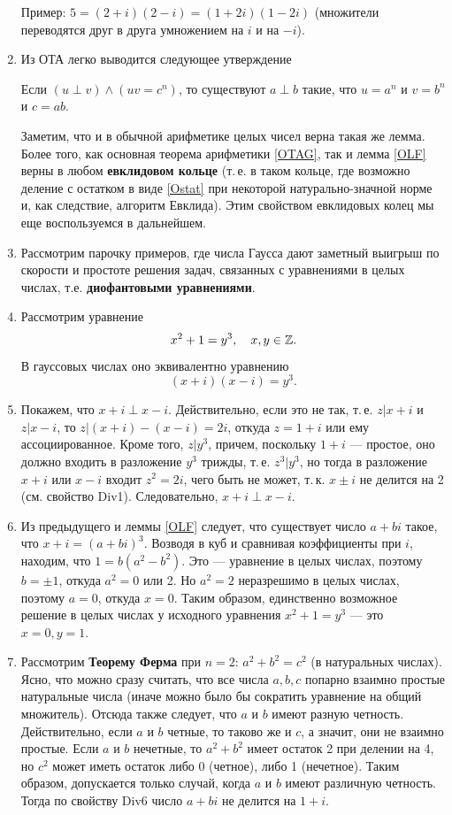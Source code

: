\begin{enumerate}
Пример: $5=(2+i)(2-i)=(1+2i)(1-2i)$ (множители переводятся друг в друга умножением на $i$ и на $-i$).

\item Из ОТА легко выводится следующее утверждение
\begin{lem}\label{OLF}
Если $(u\perp v)\land(uv=c^n)$, то существуют $a\perp b$ такие, что $u=a^n$ и $v=b^n$ и $c=ab$.
\end{lem}


Заметим, что и в обычной арифметике целых чисел верна такая же лемма. Более того, как основная теорема арифметики \ref{OTAG}, так и лемма \ref{OLF} верны в любом \textbf{евклидовом кольце} (т.\,е. в таком кольце, где возможно деление с остатком в виде \eqref{Ostat} при некоторой натурально-значной норме и, как следствие, алгоритм Евклида). Этим свойством евклидовых колец мы еще воспользуемся в дальнейшем.

\item Рассмотрим парочку примеров, где числа Гаусса дают заметный выигрыш по скорости и простоте решения задач, связанных с уравнениями в целых числах, т.е. \textbf{диофантовыми уравнениями}.
\item Рассмотрим уравнение $$x^2+1=y^3,\quad x,y\in\mathbb Z.$$
В гауссовых числах оно эквивалентно уравнению $$(x+i)(x-i)=y^3.$$

\item Покажем, что $x+i\perp x-i$. Действительно, если это не так, т.\,е. $z|x+i$ и $z|x-i$, то $z|(x+i)-(x-i)=2i$, откуда $z=1+i$ или ему ассоциированное. Кроме того, $z|y^3$, причем, поскольку $1+i$ --- простое, оно должно входить в разложение $y^3$ трижды, т.\,е. $z^3|y^3$, но тогда в разложение $x+i$ или $x-i$ входит $z^2=2i$, чего быть не может, т.\,к. $x\pm i$ не делится на 2 (см. свойство Div1). Следовательно, $x+i\perp x-i$.

\item Из предыдущего и леммы \ref{OLF} следует, что существует число $a+bi$ такое, что $x+i=(a+bi)^3$. Возводя в куб и сравнивая коэффициенты при $i$, находим, что $1=b(a^2-b^2)$. Это --- уравнение в целых числах, поэтому $b=\pm 1$, откуда $a^2=0$ или 2. Но $a^2=2$ неразрешимо в целых числах, поэтому $a=0$, откуда $x=0$. Таким образом, единственно возможное решение в целых числах у исходного уравнения $x^2+1=y^3$ --- это $x=0, y=1$.

\item Рассмотрим \textbf{Теорему Ферма} при $n=2$: $a^2+b^2=c^2$ (в натуральных числах). Ясно, что можно сразу считать, что все числа $a,b,c$ попарно взаимно простые натуральные числа (иначе можно было бы сократить уравнение на общий множитель). Отсюда также следует, что $a$ и $b$ имеют разную четность. Действительно, если $a$ и $b$ четные, то таково же и $c$, а значит, они не взаимно простые. Если $a$ и $b$ нечетные, то $a^2+b^2$ имеет остаток 2 при делении на 4, но $c^2$ может иметь остаток либо 0 (четное), либо 1 (нечетное). Таким образом, допускается только случай, когда $a$ и $b$ имеют различную четность. Тогда по свойству Div6 число $a+bi$ не делится на $1+i$.


\end{enumerate}
